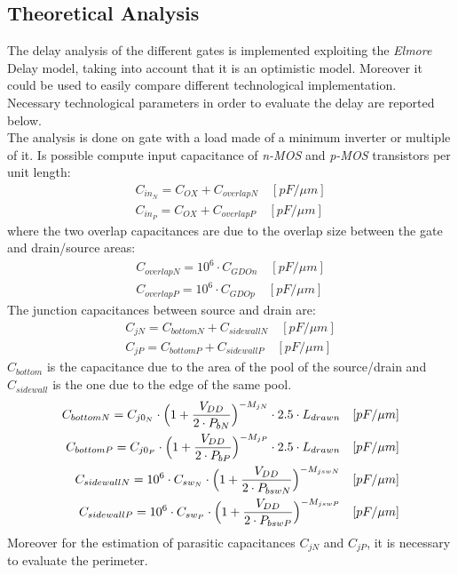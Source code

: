 \documentclass[12pt,  english, makeidx, a4paper, titlepage, oneside]{article}
\begin{document}
\subsection{Theoretical Analysis}
\label{captech*}
The delay analysis of the different gates is implemented exploiting the \textit{Elmore} Delay model, taking into account that it is an optimistic model. Moreover it could be used to easily compare different technological implementation.\\
Necessary technological parameters in order to evaluate the delay are reported below.\\
The analysis is done on gate with a load made of a minimum inverter or multiple of it. Is possible compute input capacitance of \textit{n-MOS} and \textit{p-MOS} transistors per unit length:
\begin{eqnarray}
C_{in_N}=C_{OX}+C_{overlapN} \quad [pF/\mu m]\\
C_{in_P}=C_{OX}+C_{overlapP} \quad [pF/\mu m]
\end{eqnarray}
where the two overlap capacitances are due to the overlap size between the gate and drain/source areas:
\begin{eqnarray}
C_{overlapN}=10^6 \cdot C_{GDOn} \quad [pF/\mu m]\\
C_{overlapP}=10^6 \cdot C_{GDOp} \quad [pF/\mu m]
\end{eqnarray}
The junction capacitances between source and drain are:
\begin{eqnarray}
C_{jN}=C_{bottomN} + C_{sidewallN} \quad [pF/\mu m]\\
C_{jP}=C_{bottomP} + C_{sidewallP} \quad [pF/\mu m]
\end{eqnarray}
$C_{bottom}$ is the capacitance due to the area of the pool of the source/drain and $C_{sidewall}$ is the one due to the edge of the same pool.
\begin{eqnarray}
C_{bottomN}=C_{j0_N} \cdot \Bigl(1+ \frac{V_{DD}}{2 \cdot P_{bN}} \Bigr)^{-M_{jN}} \cdot 2.5 \cdot L_{drawn} \quad [pF/\mu m]\\
C_{bottomP}=C_{j0_P} \cdot \Bigl(1+ \frac{V_{DD}}{2 \cdot P_{bP}} \Bigr)^{-M_{jP}} \cdot 2.5 \cdot L_{drawn} \quad [pF/\mu m]\\
C_{sidewallN}=10^6 \cdot C_{sw_N} \cdot \Bigl(1+ \frac{V_{DD}}{2 \cdot P_{bswN}} \Bigr)^{-M_{jswN}} \quad [pF/\mu m]\\
C_{sidewallP}=10^6 \cdot C_{sw_P} \cdot \Bigl(1+ \frac{V_{DD}}{2 \cdot P_{bswP}} \Bigr)^{-M_{jswP}} \quad [pF/\mu m]
\end{eqnarray}
Moreover for the estimation of parasitic capacitances $C_{jN}$ and $C_{jP}$, it is necessary to evaluate the perimeter.
\end{document}
